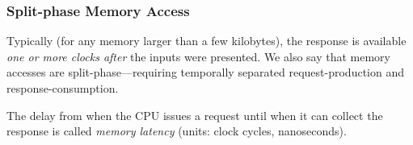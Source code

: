 \begin{frame}
\frametitle{Split-phase Memory Access}

\begin{center}
\end{center}

\vspace*{1ex}

Typically (for any memory larger than a few kilobytes), the response
is available \emph{one or more clocks after} the inputs were
presented.  We also say that memory accesses are
\alert{split-phase}---requiring temporally separated request-production
and response-consumption.

\vspace*{1ex}

\pause

The delay from when the CPU issues a request until when it can collect
the response is called \emph{memory latency} (units: clock cycles,
nanoseconds).

\end{frame}


